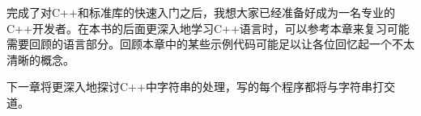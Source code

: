 完成了对C++和标准库的快速入门之后，我想大家已经准备好成为一名专业的C++开发者。在本书的后面更深入地学习C++语言时，可以参考本章来复习可能需要回顾的语言部分。回顾本章中的某些示例代码可能足以让各位回忆起一个不太清晰的概念。

下一章将更深入地探讨C++中字符串的处理，写的每个程序都将与字符串打交道。
